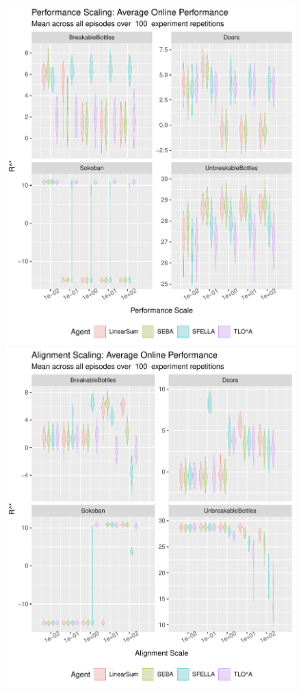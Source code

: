 \begin{figure}
  \includegraphics[width=\columnwidth]{output/multirun_n100_eeba_rolfonline_4agents_Performance.pdf}
  \includegraphics[width=\columnwidth]{output/multirun_n100_eeba_rolfonline_4agents_Alignment.pdf}

\end{figure}
